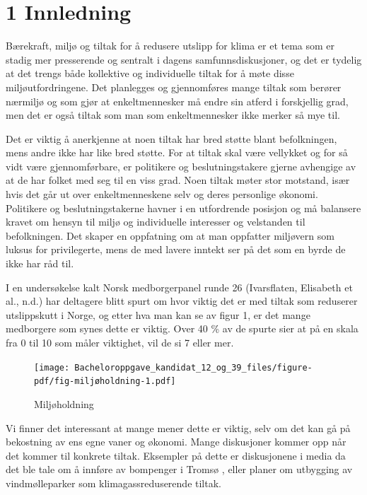 \documentclass[
  12pt,
  letterpaper,
  DIV=11,
  numbers=noendperiod]{scrartcl}
\begin{document}
\newpage

\hypertarget{innledning}{%
\section{1 Innledning}\label{innledning}}

Bærekraft, miljø og tiltak for å redusere utslipp for klima er et tema
som er stadig mer presserende og sentralt i dagens samfunnsdiskusjoner,
og det er tydelig at det trengs både kollektive og individuelle tiltak
for å møte disse miljøutfordringene. Det planlegges og gjennomføres
mange tiltak som berører nærmiljø og som gjør at enkeltmennesker må
endre sin atferd i forskjellig grad, men det er også tiltak som man som
enkeltmennesker ikke merker så mye til.

Det er viktig å anerkjenne at noen tiltak har bred støtte blant
befolkningen, mens andre ikke har like bred støtte. For at tiltak skal
være vellykket og for så vidt være gjennomførbare, er politikere og
beslutningstakere gjerne avhengige av at de har folket med seg til en
viss grad. Noen tiltak møter stor motstand, især hvis det går ut over
enkeltmenneskene selv og deres personlige økonomi. Politikere og
beslutningstakerne havner i en utfordrende posisjon og må balansere
kravet om hensyn til miljø og individuelle interesser og velstanden til
befolkningen. Det skaper en oppfatning om at man oppfatter miljøvern som
luksus for privilegerte, mens de med lavere inntekt ser på det som en
byrde de ikke har råd til.

I en undersøkelse kalt Norsk medborgerpanel runde 26 (Ivarsflaten,
Elisabeth et al., n.d.) har deltagere blitt spurt om hvor viktig det er
med tiltak som reduserer utslippskutt i Norge, og etter hva man kan se
av figur 1, er det mange medborgere som synes dette er viktig. Over 40
\% av de spurte sier at på en skala fra 0 til 10 som måler viktighet,
vil de si 7 eller mer.

\begin{figure}[H]

{\centering \texttt{[image: Bacheloroppgave\_kandidat\_12\_og\_39\_files/figure-pdf/fig-miljøholdning-1.pdf]}

}

\caption{\label{fig-miljøholdning}Miljøholdning}

\end{figure}

Vi finner det interessant at mange mener dette er viktig, selv om det
kan gå på bekostning av ens egne vaner og økonomi. Mange diskusjoner
kommer opp når det kommer til konkrete tiltak. Eksempler på dette er
diskusjonene i media da det ble tale om å innføre av bompenger i Tromsø
, eller planer om utbygging av vindmølleparker som klimagassreduserende
tiltak.
\end{document}
